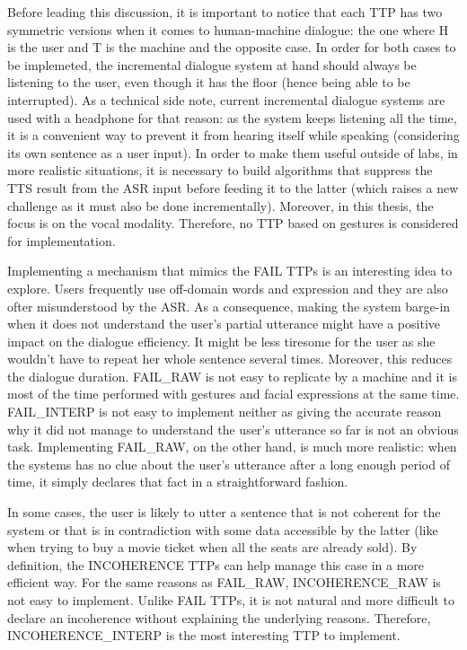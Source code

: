           Before leading this discussion, it is important to notice that each TTP has two symmetric versions when it comes to human-machine dialogue: the one where H is the user and T is the machine and the opposite case. In order for both cases to be implemeted, the incremental dialogue system at hand should always be listening to the user, even though it has the floor (hence being able to be interrupted). As a technical side note, current incremental dialogue systems are used with a headphone for that reason: as the system keeps listening all the time, it is a convenient way to prevent it from hearing itself while speaking (considering its own sentence as a user input). In order to make them useful outside of labs, in more realistic situations, it is necessary to build algorithms that suppress the TTS result from the ASR input before feeding it to the latter (which raises a new challenge as it must also be done incrementally). Moreover, in this thesis, the focus is on the vocal modality. Therefore, no TTP based on gestures is considered for implementation.

          Implementing a mechanism that mimics the FAIL TTPs is an interesting idea to explore. Users frequently use off-domain words and expression \cite{Ghigi2014} and they are also ofter misunderstood by the ASR. As a consequence, making the system barge-in when it does not understand the user's partial utterance might have a positive impact on the dialogue efficiency. It might be less tiresome for the user as she wouldn't have to repeat her whole sentence several times. Moreover, this reduces the dialogue duration. FAIL\_RAW is not easy to replicate by a machine and it is most of the time performed with gestures and facial expressions at the same time. FAIL\_INTERP is not easy to implement neither as giving the accurate reason why it did not manage to understand the user's utterance so far is not an obvious task. Implementing FAIL\_RAW, on the other hand, is much more realistic: when the systems has no clue about the user's utterance after a long enough period of time, it simply declares that fact in a straightforward fashion.

          In some cases, the user is likely to utter a sentence that is not coherent for the system or that is in contradiction with some data accessible by the latter (like when trying to buy a movie ticket when all the seats are already sold). By definition, the INCOHERENCE TTPs can help manage this case in a more efficient way. For the same reasons as FAIL\_RAW, INCOHERENCE\_RAW is not easy to implement. Unlike FAIL TTPs, it is not natural and more difficult to declare an incoherence without explaining the underlying reasons. Therefore, INCOHERENCE\_INTERP is the most interesting TTP to implement.

